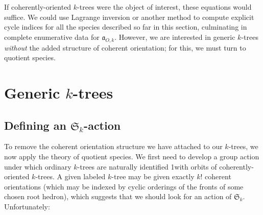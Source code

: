 \documentclass[sectionflow,singlespace,twoside,boldmathhdr]{brandiss} %
\numberwithin{section}{chapter}
\numberwithin{figure}{chapter}
\begin{document}
If coherently-oriented $k$-trees were the object of interest, these equations would suffice.
We could use Lagrange inversion or another method to compute explicit cycle indices for all the species described so far in this section, culminating in complete enumerative data for $\mathfrak{a}_{O, k}$.
However, we are interested in generic $k$-trees \emph{without} the added structure of coherent orientation; for this, we must turn to quotient species.

\section{Generic $k$-trees}
\subsection{Defining an $\mathfrak{S}_{k}$-action}\label{ss:saction}
To remove the coherent orientation structure we have attached to our $k$-trees, we now apply the theory of quotient species.
We first need to develop a group action under which ordinary $k$-trees are naturally identified 1with orbits of coherently-oriented $k$-trees.
A given labeled $k$-tree may be given exactly $k!$ coherent orientations (which may be indexed by cyclic orderings of the fronts of some chosen root hedron), which suggests that we should look for an action of $\mathfrak{S}_{k}$. Unfortunately:
\end{document}
